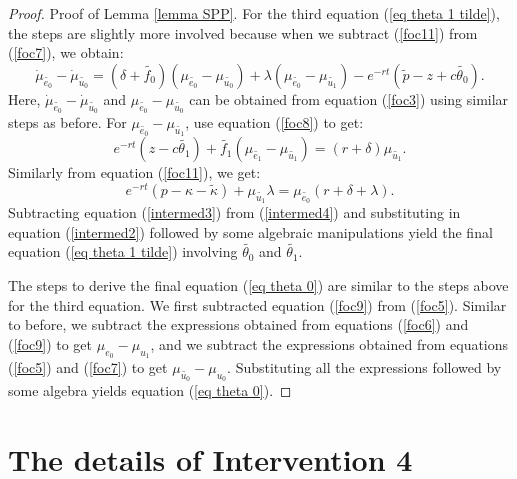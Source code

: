 \documentclass[12pt]{article} %
\theoremstyle{definition}
\begin{document}
\begin{proof}{Proof of Lemma \ref{lemma SPP}.}
For the third equation (\ref{eq theta 1 tilde}), the steps are slightly more involved because when we subtract (\ref{foc11}) from (\ref{foc7}), we obtain:
\begin{equation}
   \dot{\mu}_{\tilde{e_0}}-\dot{\mu}_{\tilde{u_0}}=(\delta + \tilde{f_0})(\mu_{\tilde{e_0}}-\mu_{\tilde{u_0}}) + \lambda(\mu_{\tilde{e_0}}-\mu_{\tilde{u_1}})-e^{-rt}(\tilde{p}-z+c\tilde{\theta_0}). \label{intermed2}
\end{equation}
Here, $\dot{\mu}_{\tilde{e_0}}-\dot{\mu}_{\tilde{u_0}}$ and $\mu_{\tilde{e_0}}-\mu_{\tilde{u_0}}$ can be obtained from equation (\ref{foc3}) using similar steps as before. For $\mu_{\tilde{e_0}}-\mu_{\tilde{u_1}}$, use equation (\ref{foc8}) to get:
\begin{equation}
    e^{-rt}(z-c\tilde{\theta_1}) + \tilde{f_1}(\mu_{\tilde{e_1}}-\mu_{\tilde{u_1}}) = (r+\delta){\mu}_{\tilde{u_1}}. \label{intermed3}
\end{equation}
Similarly from equation (\ref{foc11}), we get:  
\begin{equation}
    e^{-rt}(p-\kappa-\tilde{\kappa})+\mu_{\tilde{u_1}} \lambda = \mu_{\tilde{e_0}}(r + \delta + \lambda). \label{intermed4}
\end{equation}
Subtracting equation (\ref{intermed3}) from (\ref{intermed4}) and substituting in equation (\ref{intermed2}) followed by some algebraic manipulations yield the final equation (\ref{eq theta 1 tilde}) involving $\tilde{\theta_0}$ and $\tilde{\theta_1}$. 

The steps to derive the final equation (\ref{eq theta 0}) are similar to the steps above for the third equation. We first subtracted equation (\ref{foc9}) from (\ref{foc5}). Similar to before, we subtract the expressions obtained from equations (\ref{foc6}) and (\ref{foc9}) to get $\mu_{e_0}-\mu_{u_1}$, and we subtract the expressions obtained from equations (\ref{foc5}) and (\ref{foc7}) to get $\mu_{\tilde{u_0}}-\mu_{u_0}$. Substituting all the expressions followed by some algebra yields equation (\ref{eq theta 0}).
\end{proof}

\fi






\section{The details of Intervention 4 \label{section appendix intervention 4}}
\end{document}

